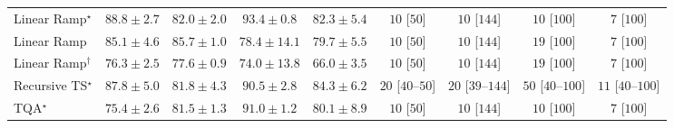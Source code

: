 \begin{tabular}{l|cccc|cccc|}
Linear Ramp$^\star$ & {\cellcolor[HTML]{831A83}} \color[HTML]{F1F1F1} $88.8\pm 2.7$ & {\cellcolor[HTML]{8A55A7}} \color[HTML]{F1F1F1} $82.0\pm 2.0$ & {\cellcolor[HTML]{5F055C}} \color[HTML]{F1F1F1} $93.4\pm 0.8$ & {\cellcolor[HTML]{8A54A6}} \color[HTML]{F1F1F1} $82.3\pm 5.4$ & {\cellcolor[HTML]{FFF6F2}} \color[HTML]{000000} $10$ [$50$] & {\cellcolor[HTML]{FFF6F2}} \color[HTML]{000000} $10$ [$144$] & {\cellcolor[HTML]{FFF6F2}} \color[HTML]{000000} $10$ [$100$] & {\cellcolor[HTML]{FFF6F2}} \color[HTML]{000000} $7$ [$100$] \\
Linear Ramp & {\cellcolor[HTML]{873D9A}} \color[HTML]{F1F1F1} $85.1\pm 4.6$ & {\cellcolor[HTML]{873696}} \color[HTML]{F1F1F1} $85.7\pm 1.0$ & {\cellcolor[HTML]{8C72B5}} \color[HTML]{F1F1F1} $78.4\pm 14.1$ & {\cellcolor[HTML]{8C68AF}} \color[HTML]{F1F1F1} $79.7\pm 5.5$ & {\cellcolor[HTML]{FFF6F2}} \color[HTML]{000000} $10$ [$50$] & {\cellcolor[HTML]{FFF6F2}} \color[HTML]{000000} $10$ [$144$] & {\cellcolor[HTML]{FFF3F0}} \color[HTML]{000000} $19$ [$100$] & {\cellcolor[HTML]{FFF6F2}} \color[HTML]{000000} $7$ [$100$] \\
Linear Ramp$^\dagger$ & {\cellcolor[HTML]{8C84BD}} \color[HTML]{F1F1F1} $76.3\pm 2.5$ & {\cellcolor[HTML]{8C79B8}} \color[HTML]{F1F1F1} $77.6\pm 0.9$ & {\cellcolor[HTML]{8C95C6}} \color[HTML]{F1F1F1} $74.0\pm 13.8$ & {\cellcolor[HTML]{AFC8E0}} \color[HTML]{000000} $66.0\pm 3.5$ & {\cellcolor[HTML]{FFF6F2}} \color[HTML]{000000} $10$ [$50$] & {\cellcolor[HTML]{FFF6F2}} \color[HTML]{000000} $10$ [$144$] & {\cellcolor[HTML]{FFF3F0}} \color[HTML]{000000} $19$ [$100$] & {\cellcolor[HTML]{FFF6F2}} \color[HTML]{000000} $7$ [$100$] \\
Recursive TS$^\star$ & {\cellcolor[HTML]{84248A}} \color[HTML]{F1F1F1} $87.8\pm 5.0$ & {\cellcolor[HTML]{8A58A8}} \color[HTML]{F1F1F1} $81.8\pm 4.3$ & {\cellcolor[HTML]{7B0D76}} \color[HTML]{F1F1F1} $90.5\pm 2.8$ & {\cellcolor[HTML]{88449E}} \color[HTML]{F1F1F1} $84.3\pm 6.2$ & {\cellcolor[HTML]{FFF3F0}} \color[HTML]{000000} $20$ [$40$--$50$] & {\cellcolor[HTML]{FFF3F0}} \color[HTML]{000000} $20$ [$39$--$144$] & {\cellcolor[HTML]{FEECE9}} \color[HTML]{000000} $50$ [$40$--$100$] & {\cellcolor[HTML]{FFF6F2}} \color[HTML]{000000} $11$ [$40$--$100$] \\
TQA$^\star$ & {\cellcolor[HTML]{8C8BC0}} \color[HTML]{F1F1F1} $75.4\pm 2.6$ & {\cellcolor[HTML]{8A59A8}} \color[HTML]{F1F1F1} $81.5\pm 1.3$ & {\cellcolor[HTML]{760C71}} \color[HTML]{F1F1F1} $91.0\pm 1.2$ & {\cellcolor[HTML]{8B65AE}} \color[HTML]{F1F1F1} $80.1\pm 8.9$ & {\cellcolor[HTML]{FFF6F2}} \color[HTML]{000000} $10$ [$50$] & {\cellcolor[HTML]{FFF6F2}} \color[HTML]{000000} $10$ [$144$] & {\cellcolor[HTML]{FFF6F2}} \color[HTML]{000000} $10$ [$100$] & {\cellcolor[HTML]{FFF6F2}} \color[HTML]{000000} $7$ [$100$] \\

\end{tabular}
